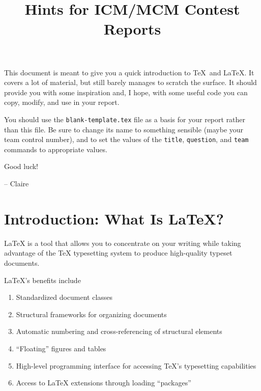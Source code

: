 \documentclass{icmmcm}
\title{\latex Hints for ICM/MCM Contest Reports}
\newcommand{\bslash}{\symbol{'134}}%
\newcommand{\bsl}{{\texttt{\bslash}}}
\newcommand{\com}[1]{\bsl\texttt{#1}\xspace}
\newcommand{\file}[1]{\texttt{#1}\xspace}
\newcommand{\tex}{\TeX\xspace}
\newcommand{\latex}{\LaTeX\xspace}
\begin{document}

\begin{summary}
  This document is meant to give you a quick introduction to \TeX\ and
  \LaTeX.  It covers a lot of material, but still barely manages to
  scratch the surface.  It should provide you with some inspiration
  and, I hope, with some useful code you can copy, modify, and use in
  your report.

  You should use the \file{blank-template.tex} file as a basis for
  your report rather than this file.  Be sure to change its name to
  something sensible (maybe your team control number), and to set the
  values of the \com{title}, \com{question}, and \com{team} commands
  to appropriate values.

  Good luck!

  \hfill{}-- Claire
\end{summary}
 


\maketitle
\tableofcontents

\listoffigures
\listoftables  
 



\section{Introduction: What Is \latex?}%
\label{sec:introduction}

\latex is a tool that allows you to concentrate on your writing while
taking advantage of the \tex typesetting system to produce
high-quality typeset documents.

\latex's benefits include
\begin{enumerate}
\item Standardized document classes
\item Structural frameworks for organizing documents
\item Automatic numbering and cross-referencing of structural elements
\item ``Floating'' figures and tables
\item High-level programming interface for accessing \tex's
  typesetting capabilities
\item Access to \latex extensions through loading ``packages''
\end{enumerate}
\end{document}
